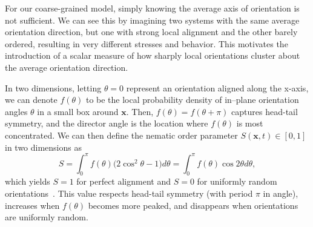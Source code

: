 \documentclass[11pt]{article}
\begin{document}
For our coarse-grained model, simply knowing the average axis of orientation is not sufficient. We can see this by imagining two systems with the same average orientation direction, but one with strong local alignment and the other barely ordered, resulting in very different stresses and behavior. This motivates the introduction of a scalar measure of how sharply local orientations cluster about the average orientation direction. 

In two dimensions, letting $\theta=0$ represent an orientation aligned along the x-axis, we can denote $f(\theta)$ to be the local probability density of in–plane orientation angles $\theta$ in a small box around $\mathbf{x}$. Then, $f(\theta)=f(\theta+\pi)$ captures head-tail symmetry, and the director angle is the location where $f(\theta)$ is most concentrated. We can then define the nematic order parameter $S(\mathbf{x},t)\in[0,1]$ in two dimensions as 
\begin{equation}
S = \int_{0}^{\pi} f(\theta)\big(2\cos^{2}\theta-1\big)d\theta
=\int_{0}^{\pi} f(\theta)\cos 2\theta d\theta,
\end{equation}
which yields $S=1$ for perfect alignment and $S=0$ for uniformly random orientations~\cite{degennes1993physics}. This value respects head-tail symmetry (with period $\pi$ in angle), increases when $f(\theta)$ becomes more peaked, and disappears when orientations are uniformly random. 
\end{document}
